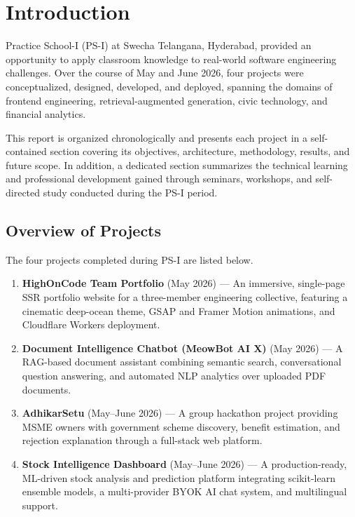 \documentclass{book}
\begin{document}
\vfill
\par{}

\tableofcontents
\listoffigures
\listoftables

\chapter{Introduction}

\par\noindent Practice School-I (PS-I) at Swecha Telangana, Hyderabad, provided an opportunity to apply classroom knowledge to real-world software engineering challenges. Over the course of May and June 2026, four projects were conceptualized, designed, developed, and deployed, spanning the domains of frontend engineering, retrieval-augmented generation, civic technology, and financial analytics.

\par\noindent This report is organized chronologically and presents each project in a self-contained section covering its objectives, architecture, methodology, results, and future scope. In addition, a dedicated section summarizes the technical learning and professional development gained through seminars, workshops, and self-directed study conducted during the PS-I period.

\section{Overview of Projects}

\par\noindent The four projects completed during PS-I are listed below.

\begin{enumerate}
  \item \textbf{HighOnCode Team Portfolio} (May 2026) --- An immersive, single-page SSR portfolio website for a three-member engineering collective, featuring a cinematic deep-ocean theme, GSAP and Framer Motion animations, and Cloudflare Workers deployment.
  \item \textbf{Document Intelligence Chatbot (MeowBot AI X)} (May 2026) --- A RAG-based document assistant combining semantic search, conversational question answering, and automated NLP analytics over uploaded PDF documents.
  \item \textbf{AdhikarSetu} (May--June 2026) --- A group hackathon project providing MSME owners with government scheme discovery, benefit estimation, and rejection explanation through a full-stack web platform.
  \item \textbf{Stock Intelligence Dashboard} (May--June 2026) --- A production-ready, ML-driven stock analysis and prediction platform integrating scikit-learn ensemble models, a multi-provider BYOK AI chat system, and multilingual support.
\end{enumerate}
\end{document}
